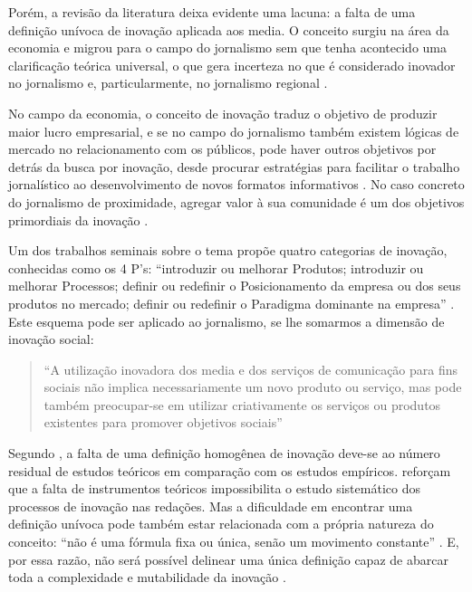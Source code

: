\documentclass[portuguese]{textolivre}
\begin{document}
Porém, a revisão da literatura deixa evidente uma lacuna: a falta de uma
definição unívoca de inovação aplicada aos media. O conceito surgiu na
área da economia e migrou para o campo do jornalismo sem que tenha
acontecido uma clarificação teórica universal, o que gera incerteza no
que é considerado inovador no jornalismo e, particularmente, no
jornalismo regional \cite{Granado2020,Posetti2018}.

No campo da economia, o conceito de inovação traduz o objetivo de
produzir maior lucro empresarial, e se no campo do jornalismo também
existem lógicas de mercado no relacionamento com os públicos, pode haver
outros objetivos por detrás da busca por inovação, desde procurar
estratégias para facilitar o trabalho jornalístico ao desenvolvimento de
novos formatos informativos \cite{Sixto-garcia2023}. No caso
concreto do jornalismo de proximidade, agregar valor à sua comunidade é
um dos objetivos primordiais da inovação \cite{Jeronimo2020,Carvalheiro2021,Correia2021}.

Um dos trabalhos seminais sobre o tema propõe quatro categorias de
inovação, conhecidas como os 4 P's: ``introduzir ou melhorar Produtos;
introduzir ou melhorar Processos; definir ou redefinir o Posicionamento
da empresa ou dos seus produtos no mercado; definir ou redefinir o
Paradigma dominante na empresa'' \cite[p.~172]{Francis2005}. Este
esquema pode ser aplicado ao jornalismo, se lhe somarmos a dimensão de
inovação social:

\begin{quote}
``A utilização inovadora dos media e dos serviços de comunicação para
fins sociais não implica necessariamente um novo produto ou serviço, mas
pode também preocupar-se em utilizar criativamente os serviços ou
produtos existentes para promover objetivos sociais''
\cite[p.~17]{Dogruel2013}
\end{quote}

Segundo \textcite{Dogruel2013}, a falta de uma definição homogênea de inovação
deve-se ao número residual de estudos teóricos em comparação com os
estudos empíricos. \textcite{Weiss2010} reforçam que a falta de
instrumentos teóricos impossibilita o estudo sistemático dos processos
de inovação nas redações. Mas a dificuldade em encontrar uma definição
unívoca pode também estar relacionada com a própria natureza do
conceito: ``não é uma fórmula fixa ou única, senão um movimento
constante'' \cite[p.~166]{Flores2017}. E, por essa razão, não será
possível delinear uma única definição capaz de abarcar toda a
complexidade e mutabilidade da inovação \cite{Flores2017}.
\end{document}
